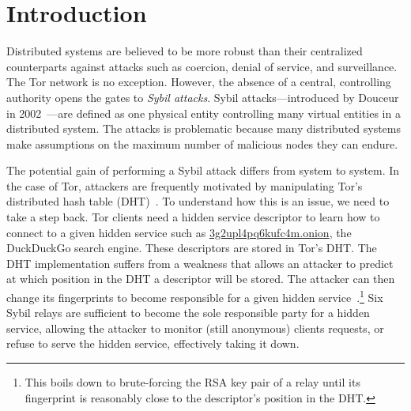 \section{Introduction}
\label{sec:introduction}

Distributed systems are believed to be more robust than their centralized
counterparts against attacks such as coercion, denial of service, and
surveillance.  The Tor network is no exception. 
However, the absence of a central, controlling authority opens the gates to
\emph{Sybil attacks}.  Sybil attacks---introduced by Douceur in
2002~\cite{Douceur2002a}---are defined as one physical entity controlling many
virtual entities in a distributed system.  The attacks is problematic because
many distributed systems make assumptions on the maximum number of malicious
nodes they can endure.

The potential gain of performing a Sybil attack differs from system to system.
In the case of Tor, attackers are frequently motivated by manipulating Tor's
distributed hash table (DHT)~\cite{rendspec}.  To understand how this is an
issue, we need to take a step back.  Tor clients need a hidden service
descriptor to learn how to connect to a given hidden service such as
\url{3g2upl4pq6kufc4m.onion}, the DuckDuckGo search engine.  These descriptors
are stored in Tor's DHT.  The DHT implementation suffers from a weakness that
allows an attacker to predict at which position in the DHT a descriptor will be
stored.  The attacker can then change its fingerprints to become responsible
for a given hidden service~\cite{Biryukov2013a}.\footnote{This boils down to
brute-forcing the RSA key pair of a relay until its fingerprint is reasonably
close to the descriptor's position in the DHT.}  Six Sybil relays are
sufficient to become the sole responsible party for a hidden service, allowing
the attacker to monitor (still anonymous) clients requests, or refuse to serve
the hidden service, effectively taking it down.


